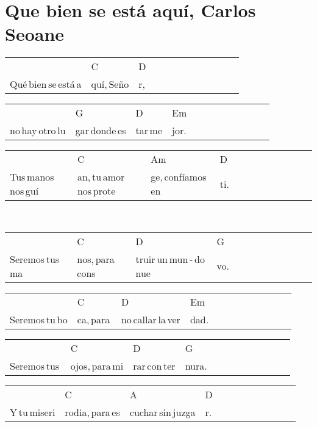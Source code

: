 \section*{Que bien se está aquí, Carlos Seoane\hfill}
\begin{multicols}{2}
\noindent
\begin{minipage}{\columnwidth}
\noindent
\noindent
\begin{tabular}{llllllllllll}
&C&D\\
Qué\,bien\,se\,está\,a&quí,\,Seño&r,
\end{tabular}

\noindent
\begin{tabular}{llllllllllll}
&G&D&Em\\
no\,hay\,otro\,lu&gar\,donde\,es&tar\,me&jor.
\end{tabular}

\noindent
\begin{tabular}{llllllllllll}
&C&Am&D\\
Tus\,manos\,nos\,guí&an,\,tu\,amor\,nos\,prote&ge,\,confíamos\,en\,&ti.
\end{tabular}
\end{minipage}\\

\noindent
\begin{minipage}{\columnwidth}
\noindent
\noindent
\begin{tabular}{llllllllllll}
&C&D&G\\
Seremos\,tus\,ma&nos,\,para\,cons&truir\,un\,mun\,-\,do\,nue&vo.
\end{tabular}

\noindent
\begin{tabular}{llllllllllll}
&C&D&Em\\
Seremos\,tu\,bo&ca,\,para\,&no\,callar\,la\,ver&dad.
\end{tabular}

\noindent
\begin{tabular}{llllllllllll}
&C&D&G\\
Seremos\,tus\,&ojos,\,para\,mi&rar\,con\,ter&nura.
\end{tabular}

\noindent
\begin{tabular}{llllllllllll}
&C&A&D\\
Y\,tu\,miseri&rodia,\,para\,es&cuchar\,sin\,juzga&r.
\end{tabular}
\end{minipage}\\


\chorus{}

\end{multicols}